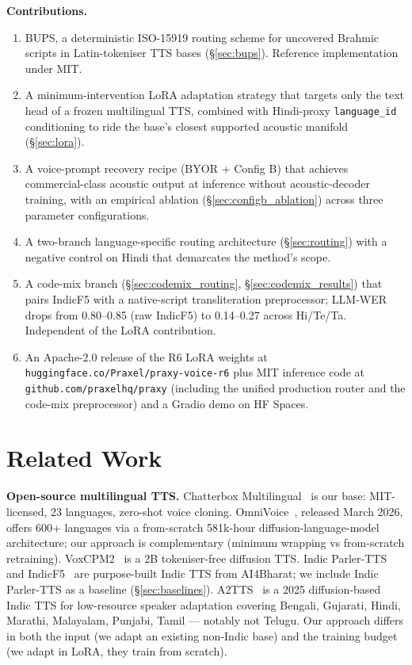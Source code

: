 \documentclass[conference,a4paper]{IEEEtran}
\newcommand{\bups}{\textsc{BUPS}}
\newcommand{\configb}{Config B}
\begin{document}
\textbf{Contributions.}
\begin{enumerate}
  \item \bups{}, a deterministic ISO-15919 routing scheme for uncovered Brahmic scripts in Latin-tokeniser TTS bases (§\ref{sec:bups}). Reference implementation under MIT.
  \item A minimum-intervention LoRA adaptation strategy that targets only the text head of a frozen multilingual TTS, combined with Hindi-proxy \texttt{language\_id} conditioning to ride the base's closest supported acoustic manifold (§\ref{sec:lora}).
  \item A voice-prompt recovery recipe (BYOR + \configb) that achieves commercial-class acoustic output at inference without acoustic-decoder training, with an empirical ablation (§\ref{sec:configb_ablation}) across three parameter configurations.
  \item A two-branch language-specific routing architecture (§\ref{sec:routing}) with a negative control on Hindi that demarcates the method's scope.
  \item A code-mix branch (§\ref{sec:codemix_routing}, §\ref{sec:codemix_results}) that pairs IndicF5 with a native-script transliteration preprocessor; LLM-WER drops from 0.80--0.85 (raw IndicF5) to 0.14--0.27 across Hi/Te/Ta. Independent of the LoRA contribution.
  \item An Apache-2.0 release of the R6 LoRA weights at \texttt{huggingface.co/Praxel/\allowbreak praxy-voice-r6} plus MIT inference code at \texttt{github.com/praxelhq/\allowbreak praxy} (including the unified production router and the code-mix preprocessor) and a Gradio demo on HF Spaces.
\end{enumerate}

\section{Related Work}
\label{sec:related}

\textbf{Open-source multilingual TTS.} Chatterbox Multilingual~\cite{chatterbox2025} is our base: MIT-licensed, 23 languages, zero-shot voice cloning. OmniVoice~\cite{omnivoice2026}, released March 2026, offers 600+ languages via a from-scratch 581k-hour diffusion-language-model architecture; our approach is complementary (minimum wrapping vs from-scratch retraining). VoxCPM2~\cite{voxcpm2} is a 2B tokeniser-free diffusion TTS. Indic Parler-TTS~\cite{parler2024} and IndicF5~\cite{indicf52024} are purpose-built Indic TTS from AI4Bharat; we include Indic Parler-TTS as a baseline (§\ref{sec:baselines}). A2TTS~\cite{a2tts2025} is a 2025 diffusion-based Indic TTS for low-resource speaker adaptation covering Bengali, Gujarati, Hindi, Marathi, Malayalam, Punjabi, Tamil --- notably not Telugu. Our approach differs in both the input (we adapt an existing non-Indic base) and the training budget (we adapt in LoRA, they train from scratch).
\end{document}
